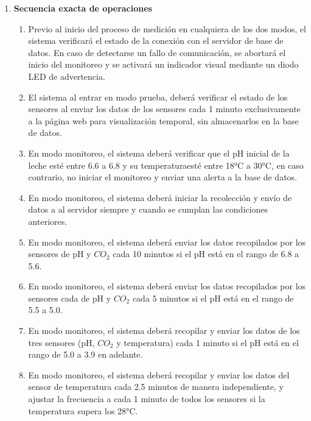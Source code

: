 \begin{enumerate}
\begin{enumerate}
\begin{enumerate}
                    \item El sistema deberá contar con dos modos de operación claramente diferenciados: modo Prueba y modo Monitoreo. Ambos modos serán activados y desactivados mediante botones físicos independientes en el microcontrolador. La presión del botón correspondiente iniciará el modo seleccionado y una nueva presión lo detendrá o saldrá del modo.

                \end{enumerate}
            
            \item \textbf{Secuencia exacta de operaciones}
                \begin{enumerate}
                    \item Previo al inicio del proceso de medición en cualquiera de los dos modos, el sistema verificará el estado de la conexión con el servidor de base de datos. En caso de detectarse un fallo de comunicación, se abortará el inicio del monitoreo y se activará un indicador visual mediante un diodo LED de advertencia.
                    \item El sistema al entrar en modo prueba, deberá verificar el estado de los sensores al enviar los datos de los sensores cada 1 minuto exclusivamente a la página web para visualización temporal, sin almacenarlos en la base de datos.
                    \item En modo monitoreo, el sistema deberá verificar que el pH inicial de la leche esté entre 6.6 a 6.8 y su temperaturaesté entre 18°C a 30°C, en caso contrario, no iniciar el monitoreo y enviar una alerta a la base de datos.
                    \item En modo monitoreo, el sistema deberá iniciar la recolección y envío de datos a al servidor siempre y cuando se cumplan las condiciones anteriores.
                    \item En modo monitoreo, el sistema deberá enviar los datos recopilados por los sensores de pH y $CO_{2}$  cada 10 minutos si el pH está en el rango de 6.8 a 5.6.
                    \item En modo monitoreo, el sistema deberá enviar los datos recopilados por los sensores cada de pH y $CO_{2}$  cada 5 minutos si el pH está en el rango de 5.5 a 5.0.
                    \item En modo monitoreo, el sistema deberá recopilar y enviar los datos de los tres sensores (pH, $CO_{2}$  y temperatura) cada 1 minuto si el pH está en el rango de 5.0 a 3.9 en adelante.
                    \item En modo monitoreo, el sistema deberá recopilar y enviar los datos del sensor de temperatura cada 2.5 minutos de manera independiente, y ajustar la frecuencia a cada 1 minuto de todos los sensores si la temperatura supera los 28°C.
                    

\end{enumerate}
\end{enumerate}
\end{enumerate}
